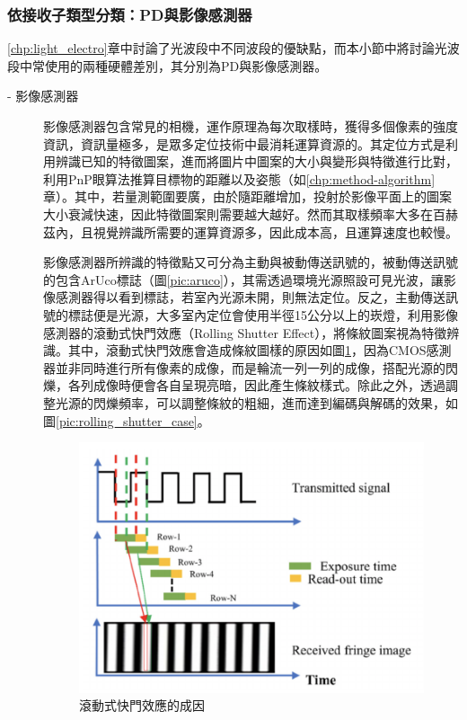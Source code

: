             \subsubsection{依接收子類型分類：PD與影像感測器}
            \label{chp:light_receiver}

                

                \ref{chp:light_electro}章中討論了光波段中不同波段的優缺點，而本小節中將討論光波段中常使用的兩種硬體差別，其分別為PD與影像感測器。

                \begin{description}

                    \item[- 影像感測器]\hfill 
                    
                    \qquad
                    影像感測器包含常見的相機，運作原理為每次取樣時，獲得多個像素的強度資訊，資訊量極多，是眾多定位技術中最消耗運算資源的。其定位方式是利用辨識已知的特徵圖案，進而將圖片中圖案的大小與變形與特徵進行比對，利用PnP眼算法推算目標物的距離以及姿態（如\ref{chp:method-algorithm}章）。其中，若量測範圍要廣，由於隨距離增加，投射於影像平面上的圖案大小衰減快速，因此特徵圖案則需要越大越好。然而其取樣頻率大多在百赫茲內，且視覺辨識所需要的運算資源多，因此成本高，且運算速度也較慢。

                    \qquad
                    影像感測器所辨識的特徵點又可分為主動與被動傳送訊號的，被動傳送訊號的包含ArUco標誌（圖\ref{pic:aruco}），其需透過環境光源照設可見光波，讓影像感測器得以看到標誌，若室內光源未開，則無法定位。反之，主動傳送訊號的標誌便是光源，大多室內定位會使用半徑15公分以上的崁燈，利用影像感測器的滾動式快門效應（Rolling Shutter Effect），將條紋圖案視為特徵辨識。其中，滾動式快門效應會造成條紋圖樣的原因如圖\ref{pic:rolling_shutter}，因為CMOS感測器並非同時進行所有像素的成像，而是輪流一列一列的成像，搭配光源的閃爍，各列成像時便會各自呈現亮暗，因此產生條紋樣式。除此之外，透過調整光源的閃爍頻率，可以調整條紋的粗細，進而達到編碼與解碼的效果，如圖\ref{pic:rolling_shutter_case}。

                    \begin{figure}[htpb]
                        \centering
                        \includegraphics[width=12cm]{ch2pic/rolling_shutter.png}
                        \caption{滾動式快門效應的成因\cite{pic:rolling_shutter}}
                        \label{pic:rolling_shutter}
                    \end{figure}


\end{description}
